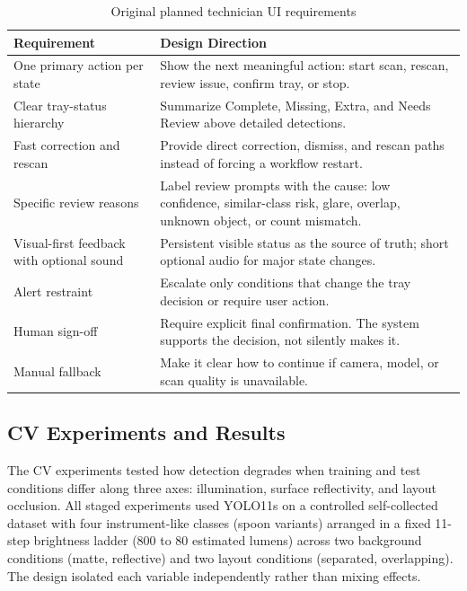 \documentclass[10pt,a4paper]{article}
\begin{document}
\begin{table}[H]
\centering
\caption{Original planned technician UI requirements}
\label{tab:original-planned-technician-ui-requirements}
\small\renewcommand{\arraystretch}{1.2}\setlength{\tabcolsep}{4pt}
\begin{tabularx}{\textwidth}{|>{\raggedright\arraybackslash}X|>{\raggedright\arraybackslash}X|}
\hline
Requirement & Design Direction \\
\hline
One primary action per state & Show the next meaningful action: start scan, rescan, review issue, confirm tray, or stop. \\
\hline
Clear tray-status hierarchy & Summarize Complete, Missing, Extra, and Needs Review above detailed detections. \\
\hline
Fast correction and rescan & Provide direct correction, dismiss, and rescan paths instead of forcing a workflow restart. \\
\hline
Specific review reasons & Label review prompts with the cause: low confidence, similar-class risk, glare, overlap, unknown object, or count mismatch. \\
\hline
Visual-first feedback with optional sound & Persistent visible status as the source of truth; short optional audio for major state changes. \\
\hline
Alert restraint & Escalate only conditions that change the tray decision or require user action. \\
\hline
Human sign-off & Require explicit final confirmation. The system supports the decision, not silently makes it. \\
\hline
Manual fallback & Make it clear how to continue if camera, model, or scan quality is unavailable. \\
\hline
\end{tabularx}
\end{table}

\subsection{CV Experiments and Results}
\label{sec:computer-vision-experiments}

The CV experiments tested how detection degrades when training and test
conditions differ along three axes: illumination, surface reflectivity,
and layout occlusion. All staged experiments used YOLO11s on a controlled
self-collected dataset with four instrument-like classes (spoon variants)
arranged in a fixed 11-step brightness ladder (800 to 80 estimated lumens)
across two background conditions (matte, reflective) and two layout
conditions (separated, overlapping). The design isolated each variable
independently rather than mixing effects.
\end{document}
